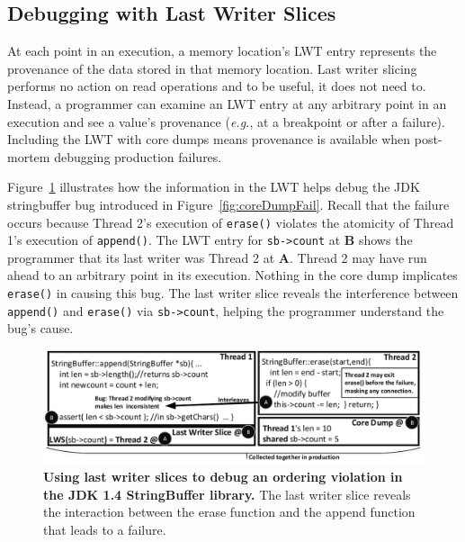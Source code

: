 \documentclass[preprint,9pt]{sigplanconf}
\newcommand{\lwt}{LWT\xspace}
\begin{document}
\subsection{Debugging with Last Writer Slices}
\label{sec:debugging}

At each point in an execution, a memory location's \lwt entry represents the
provenance of the data stored in that memory location.   Last writer slicing
performs no action on read operations and to be useful, it does not need to.
Instead, a programmer can examine an \lwt entry at any arbitrary point in an
execution and see a value's
provenance ({\em e.g.}, at a breakpoint or after a failure).  Including the \lwt with core dumps means provenance is available
when post-mortem debugging production failures.

Figure~\ref{fig:jdklws} illustrates how the information in the \lwt helps debug
the JDK stringbuffer bug introduced in Figure~\ref{fig:coreDumpFail}.  Recall
that the failure occurs because Thread 2's execution of {\tt erase()} violates
the atomicity of Thread 1's execution of {\tt append()}.  The \lwt entry for
{\tt sb->count} at {\bf B} shows the programmer that its last writer was Thread
2 at {\bf A}. Thread 2 may have run ahead to an arbitrary point in its
execution.  Nothing in the core dump implicates {\tt erase()} in causing
this bug.  The last writer slice reveals the interference between {\tt append()}
and {\tt erase()} via {\tt sb->count}, helping the programmer understand the
bug's cause.




\begin{figure}[h]
\centering
\includegraphics[width=\columnwidth]{figs/JDKStringBufferDebug2.pdf}
\caption{\label{fig:jdklws}{\bf Using last writer slices to debug an
ordering violation in the JDK 1.4 StringBuffer library.} The last writer slice reveals the interaction between the erase function and the append function that leads to a failure.}
\end{figure}
\end{document}
